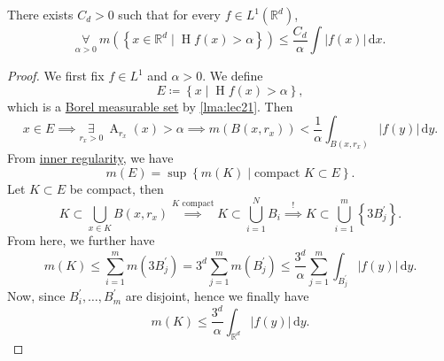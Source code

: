 \begin{theorem}\label{thm:HL-maximal-inequality}
	There exists \(C_{d} >0\) such that for every \(f\in L^1(\mathbb{R} ^d)\),
	\[
		\underset{\alpha >0}{\forall }\ m\left(\left\{x\in \mathbb{R} ^d\mid \operatorname{H}f(x) > \alpha  \right\}\right) \leq \frac{C_{d} }{\alpha }\int \left\vert f(x) \right\vert \,\mathrm{d} x.
	\]
\end{theorem}
\begin{proof}
	We first fix \(f\in L^1\) and \(\alpha >0\). We define
	\[
		E\coloneqq \left\{x\mid \operatorname{H}f (x) > \alpha \right\},
	\]
	which is a \hyperref[def:measurable-set]{Borel measurable set} by \autoref{lma:lec21}. Then
	\[
		x\in E\implies \underset{r_{x} >0}{\exists } \ \operatorname{A} _{r_{x} }(x)> \alpha \implies m(B(x, r_{x} ))< \frac{1}{\alpha }\int _{B(x, r_{x} )}\left\vert f(y) \right\vert \,\mathrm{d} y.
	\]
	From \hyperref[thm:inner-regularity]{inner regularity}, we have
	\[
		m(E) = \sup \left\{m(K)\mid \text{compact }K\subset E \right\}.
	\]
	Let \(K\subset E\) be compact, then
	\[
		K\subset \bigcup_{x\in K}B(x, r_{x} ) \overset{K \text{ compact} }{\implies } K\subset \bigcup_{i=1}^{N} B_{i} \overset{\hyperref[lma:Vitali-type-covering-lemma]{!}}{\implies} K\subset \bigcup_{i=1}^{m} \left\{3 B_{j} ^\prime \right\}.
	\]
	From here, we further have
	\[
		m(K) \leq \sum_{i=1}^{m} m(3 B_{j} ^\prime ) = 3^d \sum_{j=1}^{m} m(B_{j} ^\prime ) \leq \frac{3^d}{\alpha }\sum_{j=1}^{m} \int _{B_{j} ^\prime }\left\vert f(y) \right\vert \,\mathrm{d}y.
	\]
	Now, since \(B^\prime _{i} , \dots , B^\prime _{m}  \) are disjoint, hence we finally have
	\[
		m(K) \leq \frac{3^d}{\alpha }\int _{\mathbb{R} ^d}\left\vert f(y) \right\vert \,\mathrm{d} y.
	\]
\end{proof}